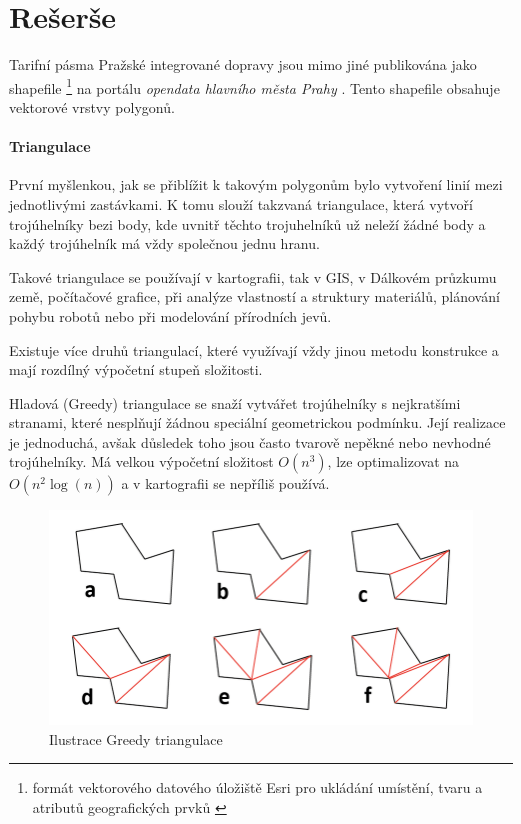 \chapter{Rešerše}
\label{0-reserse}

Tarifní pásma Pražské integrované dopravy jsou mimo jiné publikována jako shapefile 
\footnote{formát vektorového datového úložiště Esri pro ukládání umístění,
tvaru a atributů geografických prvků \cite{shapefile}}
na portálu \textit{opendata hlavního města Prahy} \cite{opendata}. Tento shapefile
obsahuje vektorové vrstvy polygonů.

\subsubsection{Triangulace}

První myšlenkou, jak se přiblížit k takovým polygonům bylo vytvoření linií mezi jednotlivými zastávkami.
K tomu slouží takzvaná triangulace, která vytvoří trojúhelníky bezi body, kde uvnitř těchto trojuhelníků  
už neleží žádné body a každý trojúhelník má vždy společnou jednu hranu. 

Takové triangulace se používají v kartografii, tak v GIS, v Dálkovém průzkumu země,
počítačové grafice, při analýze vlastností a struktury materiálů, plánování pohybu robotů
nebo při modelování přírodních jevů. \cite{bayer-delaunay}

Existuje více druhů triangulací, které využívají vždy jinou metodu konstrukce
a mají rozdílný výpočetní stupeň složitosti. 

Hladová (Greedy) triangulace se snaží vytvářet trojúhelníky s nejkratšími stranami,
které nesplňují žádnou speciální geometrickou podmínku. Její realizace je jednoduchá,
avšak důsledek toho jsou často tvarově nepěkné nebo nevhodné trojúhelníky. Má velkou výpočetní
složitost \(O(n^3)\), lze optimalizovat na \(O(n^2 \log(n))\) a v kartografii se 
nepříliš používá. \cite{vanicek}

\begin{figure}[H] \centering
    \includegraphics[width=400pt]{./pictures/triangulace-greedy.png}
    \caption[Ilustrace Greedy triangulace]{Ilustrace Greedy triangulace \cite{triangulace-greedy}}
	\label{fig:triangulace-greedy}              
\end{figure}

